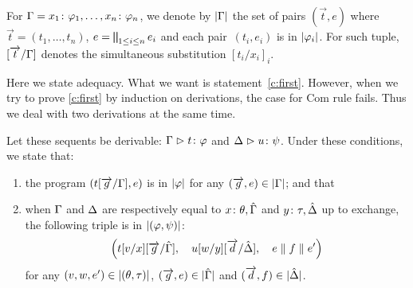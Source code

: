  \begin{proposition}
  \label{prop:w}
 \end{proposition}

For $\Gamma = {x_1} \colon{\varphi_1},\ldots,{x_n} \colon{\varphi_n}$,
we denote by $|{\Gamma}|$ the set of pairs $(\vec t,e)$ where
$\vec{t} = (t_1,\dots,t_n)$, $e = \bigparallel_{1\le i\le n} e_i$
 and each pair~$(t_i, e_i)$ is in $|{\varphi_i}|$.
For such tuple, $[\overrightarrow{t}/\Gamma]$ denotes the simultaneous substitution
$[t_i/x_i]_{i}$.

Here we state adequacy.  What we want is statement~\ref{c:first}.
However, when we try to prove \ref{c:first} by induction on derivations,
the case for Com rule fails.  Thus we deal with two derivations at the
same time.

\begin{theorem}[Adequacy]
 \label{c:adequacy}
 Let these sequents be derivable:
 $  {\Gamma}\vartriangleright{ {t} \colon{\varphi} } $
 and
 $  {\Delta}\vartriangleright{ {u} \colon{\psi} }$\enspace.
 Under these conditions, we state that:
 \begin{enumerate}[label=(\arabic{*}), ref=\textit{(\arabic{*})}]
  \item \label{c:first} the program
	$
	(t[\overrightarrow{g}/\Gamma], e)
	$
	is in $|{\varphi}|$
	 for any
	$(\overrightarrow{g},e)\in|{\Gamma}|$; and that
  \item \label{c:second}
	when $\Gamma$ and $\Delta$ are respectively
	equal to ${x} \colon{\theta}, \hat{\Gamma}$ and ${y} \colon{\tau}, \hat{\Delta}$ up to exchange,
	the following triple is in $|{(\varphi,\psi)}|$:
	\[\left(
	t[v/x][\overrightarrow g/\hat {\Gamma}],\quad
	u[w/y][\overrightarrow d/\hat {\Delta}],\quad
	 e \parallel  f \parallel e'
	\right)
	\]
	for any
	$(v,w,e')\in|{(\theta,\tau)}|$,
	$(\overrightarrow g, e)\in|{\hat{\Gamma}}|$ and
	$(\overrightarrow d, f)\in|{\hat{\Delta}}|$.
  \end{enumerate}
\end{theorem}

